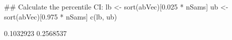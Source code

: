 \begin{Schunk}
\begin{Sinput}
 ## Calculate the percentile CI:
 lb <- sort(abVec)[0.025 * nSams]
 ub <- sort(abVec)[0.975 * nSams]
 c(lb, ub)
\end{Sinput}
\begin{Soutput}
[1] 0.1032923 0.2568537
\end{Soutput}
\end{Schunk}
